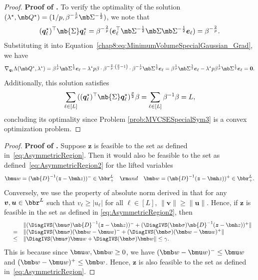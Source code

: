 \documentclass[mnsc, nonblindrev]{informswp}
\newcommand{\1}[1]{\mathds{1}{\left(#1\right)}}
\begin{document}
\begin{appendices}
\begin{proof}{\bf Proof of .}
To verify the optimality of the solution $(\lambda^\star, \mb Q^\star) = (1/p, \beta^{- \frac{1}{p}} \mb \Sigma^{-\frac{1}{2}})$, we note that
$$
(\bm q^\star_\ell)^\top \mb{\Sigma} \bm q^\star_\ell = \beta^{-\frac{2}{p}} ( \bm e_{\ell}^\top \mb \Sigma^{-\frac{1}{2}} \mb \Sigma \mb \Sigma^{-\frac{1}{2}} \bm e_{\ell}) = \beta^{-\frac{2}{p}}.
$$
Substituting it into Equation~\eqref{chap8:eq:MinimumVolumeSpecialGaussian_Grad}, we have
$$
\nabla_{\bm q_\ell} \Lambda (\mb Q^\star, \lambda^\star) = \beta^{\frac{1}{p}} \mb \Sigma^{\frac{1}{2}} \bm e_{\ell}  - \lambda^\star p \beta \cdot \beta^{-\frac{2}{p} \cdot \left(\frac{p}{2} -1 \right)}\cdot \beta^{-\frac{1}{p}} \mb \Sigma^{\frac{1}{2}}  \bm e_{\ell} = \beta^{\frac{1}{p}} \mb \Sigma^{\frac{1}{2}} \bm e_{\ell}  - \lambda^\star p \beta^{\frac{1}{p}} \mb \Sigma^{\frac{1}{2}} \bm e_{\ell} = \bm 0.
$$
Additionally, this solution satisfies
$$
\sum_{\ell \in [L]} ( (\bm q_\ell^\star)^\top \mb{\Sigma} \bm q_\ell^\star )^{\frac{p}{2}} \beta = \sum_{\ell \in [L]} \beta^{-1} \beta =  L,
$$
concluding its optimality since Problem \eqref{prob:MVCSESpecialSym3} is a convex optimization problem.
\hfill \Halmos
\end{proof}
\vspace{3mm}

\begin{proof}{\bf Proof of .}
Suppose $\bm z$ is feasible to the set as defined in~\eqref{eq:AsymmetricRegion}. Then it would also be feasible to the set as defined~\eqref{eq:AsymmetricRegion2} for the lifted variables
$$
\bmu w = (\mb{D}^{-1} (\bm z - \bmh  z))^- \in \bbr^L_+
~~~{\rm and}~~~
\bmb w= (\mb{D}^{-1} (\bm z - \bmh  z))^+ \in \bbr^L_+.
$$
Conversely, we use the property of absolute norm derived in \cite{bertsimas2006tractable} that for any $\bm v, \bm u \in \bbr^L$ such that $v_\ell\geq |u_\ell|$ for all $\ell \in [L]$, $\|\bm v\|\geq \|\bm u\|$. Hence, if $\bm z$ is feasible in the set as defined in \eqref{eq:AsymmetricRegion2}, then 
$$
\begin{array}{rcl}
&& \| (\DiagIVS(\bmu \sigma) \mb{D}^{-1} (\bm z - \bmh  z))^- + (\DiagIVS(\bmb \sigma) \mb{D}^{-1} (\bm z - \bmh  z))^+ \|\\
&=&   \| (\DiagIVS(\bmu \sigma) (\bmb w - \bmu w)^- + (\DiagIVS(\bmb \sigma) (\bmb w - \bmu w)^+  \| \\
&\leq& \|\DiagIVS(\bmu \sigma) \bmu w + \DiagIVS(\bmb \sigma) \bmb w\| \leq \gamma.
\end{array}
$$
This is because since $\bmu w, \bmb w \geq 0$, we have $(\bmb w - \bmu w)^- \leq \bmu w$ and $(\bmb w - \bmu w)^+ \leq \bmb w$.
Hence, $\bm z$ is also feasible to the set as defined in~\eqref{eq:AsymmetricRegion}.
\hfill \Halmos    
\end{proof}
\vspace{3mm}


\end{appendices}
\end{document}
